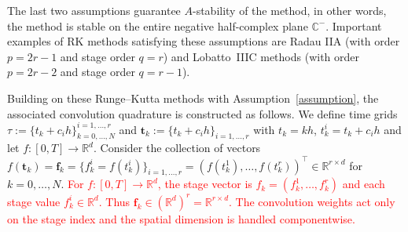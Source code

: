 \documentclass[a4paper,10pt,reqno]{amsart}
\theoremstyle{definition}
\newcommand{\R}{\mathbb{R}}      %
\newcommand{\Flder}{\rightarrow}
\begin{document}
The last two assumptions guarantee $A$-stability of the method, in other words, the method is stable on the entire negative half-complex plane $\mathbb{C}^-$.
Important examples of RK methods satisfying these assumptions are Radau IIA (with order $p = 2r - 1$ and stage order $q = r$) and Lobatto~IIIC methods (with order $p = 2r - 2$ and stage order $q = r-1$). 

Building on these Runge–Kutta methods with Assumption~\ref{assumption}, the associated convolution quadrature is constructed as follows. We define time grids $\tau:=\{t_k+c_ih\}_{k=0, \ldots,N}^{i=1, \ldots, r}$ and $\mathbf{t}_k:=\{t_k+c_ih\}_{i=1, \ldots,r}$ with $t_k=kh$, $t_k^i=t_k+c_ih$ and let $f:[0,T]\Flder\R^d$. Consider the collection of vectors $f(\mathbf{t}_k)=\mathbf{f}_k=\{f_k^i=f(t_k^i)\}_{i=1,\ldots,r}=\left(f(t_k^1),\ldots,f(t_k^r)\right)^\top\in\mathbb{R}^{r\times d}$ for $k=0,\ldots,N$. 
\textcolor{red}{
For $f:[0,T]\Flder\R^d$, the stage vector is $f_k=(f_k^1,\ldots,f_k^r)$ and each stage value $f_k^i\in \R^d$. Thus $\mathbf{f}_k\in (\R^d)^r=\R^{r\times d}$.
The convolution weights act only on the stage index and the spatial dimension is handled componentwise.}
\end{document}
